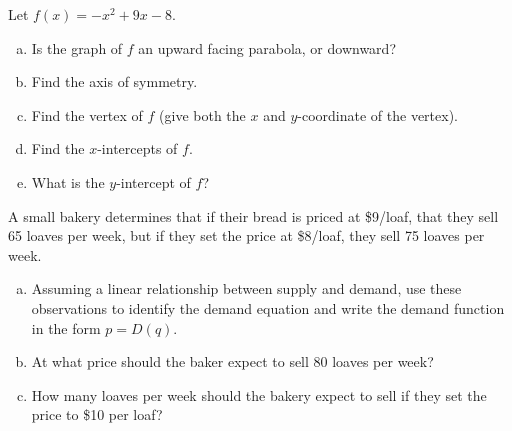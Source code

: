 \documentclass[11pt]{exam}
\begin{document}
\addpoints

\noindent
\begin{center}
\gradetable[v][pages]  %
\end{center}


\newpage %

%
%
%

\begin{questions}
\question[5] Let $f(x) = -x^2 + 9x - 8$.
\begin{enumerate}[(a)]
\item Is the graph of $f$ an upward facing parabola, or downward?
\vfill

\item Find the axis of symmetry.
\vfill

\item Find the vertex of $f$ (give both the $x$ and $y$-coordinate of the vertex).
\vfill

\item Find the $x$-intercepts of $f$.
\vfill

\item What is the $y$-intercept of $f$?
\vfill
\end{enumerate}
\newpage

\question[5] A small bakery determines that if their bread is priced at \$9/loaf, that they sell 65 loaves per week, but if they set the price at \$8/loaf, they sell 75 loaves per week.
\begin{enumerate}[(a)]
\item Assuming a linear relationship between supply and demand, use these observations to identify the demand equation and write the demand function in the form $p = D(q)$.
\vfill

\item At what price should the baker expect to sell 80 loaves per week?
\vfill

\item How many loaves per week should the bakery expect to sell if they set the price to \$10 per loaf?
\vfill


\end{enumerate}
\end{questions}
\end{document}
